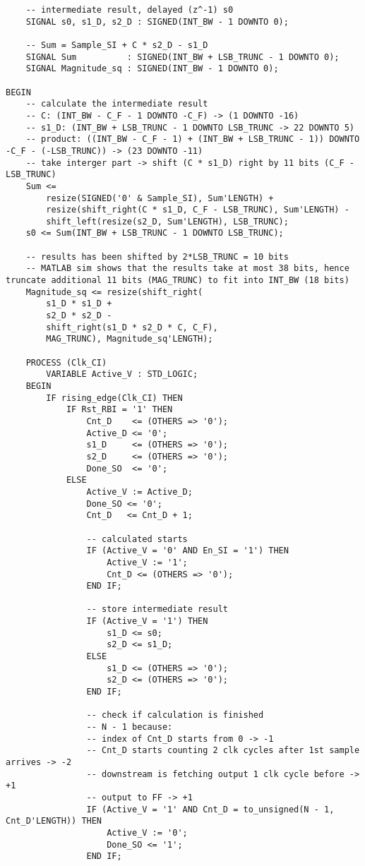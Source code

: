 \begin{lstlisting}
    -- intermediate result, delayed (z^-1) s0
    SIGNAL s0, s1_D, s2_D : SIGNED(INT_BW - 1 DOWNTO 0);

    -- Sum = Sample_SI + C * s2_D - s1_D
    SIGNAL Sum          : SIGNED(INT_BW + LSB_TRUNC - 1 DOWNTO 0);
    SIGNAL Magnitude_sq : SIGNED(INT_BW - 1 DOWNTO 0);

BEGIN
    -- calculate the intermediate result
    -- C: (INT_BW - C_F - 1 DOWNTO -C_F) -> (1 DOWNTO -16)
    -- s1_D: (INT_BW + LSB_TRUNC - 1 DOWNTO LSB_TRUNC -> 22 DOWNTO 5)
    -- product: ((INT_BW - C_F - 1) + (INT_BW + LSB_TRUNC - 1)) DOWNTO -C_F - (-LSB_TRUNC)) -> (23 DOWNTO -11)
    -- take interger part -> shift (C * s1_D) right by 11 bits (C_F - LSB_TRUNC)
    Sum <=
        resize(SIGNED('0' & Sample_SI), Sum'LENGTH) +
        resize(shift_right(C * s1_D, C_F - LSB_TRUNC), Sum'LENGTH) -
        shift_left(resize(s2_D, Sum'LENGTH), LSB_TRUNC);
    s0 <= Sum(INT_BW + LSB_TRUNC - 1 DOWNTO LSB_TRUNC);

    -- results has been shifted by 2*LSB_TRUNC = 10 bits
    -- MATLAB sim shows that the results take at most 38 bits, hence truncate additional 11 bits (MAG_TRUNC) to fit into INT_BW (18 bits)
    Magnitude_sq <= resize(shift_right(
        s1_D * s1_D +
        s2_D * s2_D -
        shift_right(s1_D * s2_D * C, C_F),
        MAG_TRUNC), Magnitude_sq'LENGTH);

    PROCESS (Clk_CI)
        VARIABLE Active_V : STD_LOGIC;
    BEGIN
        IF rising_edge(Clk_CI) THEN
            IF Rst_RBI = '1' THEN
                Cnt_D    <= (OTHERS => '0');
                Active_D <= '0';
                s1_D     <= (OTHERS => '0');
                s2_D     <= (OTHERS => '0');
                Done_SO  <= '0';
            ELSE
                Active_V := Active_D;
                Done_SO <= '0';
                Cnt_D   <= Cnt_D + 1;

                -- calculated starts
                IF (Active_V = '0' AND En_SI = '1') THEN
                    Active_V := '1';
                    Cnt_D <= (OTHERS => '0');
                END IF;

                -- store intermediate result
                IF (Active_V = '1') THEN
                    s1_D <= s0;
                    s2_D <= s1_D;
                ELSE
                    s1_D <= (OTHERS => '0');
                    s2_D <= (OTHERS => '0');
                END IF;

                -- check if calculation is finished
                -- N - 1 because:
                -- index of Cnt_D starts from 0 -> -1
                -- Cnt_D starts counting 2 clk cycles after 1st sample arrives -> -2
                -- downstream is fetching output 1 clk cycle before -> +1
                -- output to FF -> +1
                IF (Active_V = '1' AND Cnt_D = to_unsigned(N - 1, Cnt_D'LENGTH)) THEN
                    Active_V := '0';
                    Done_SO <= '1';
                END IF;


\end{lstlisting}
